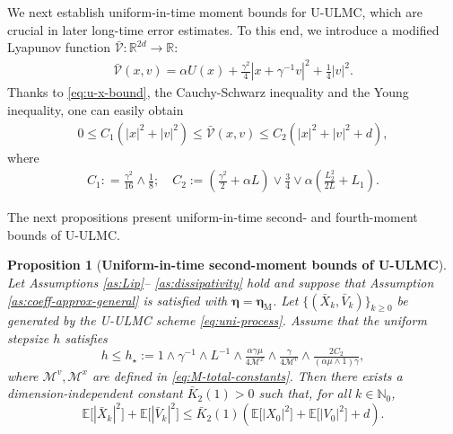 \documentclass[12pt]{article}
\numberwithin{equation}{section}
\newcommand{\M}{\mathcal{M}}
\newtheorem{prop}{Proposition}[section]
\begin{document}
We next establish uniform-in-time moment bounds for U-ULMC, which are crucial in later long-time error estimates.
To this end, we introduce a modified Lyapunov function  $\bar{\mathcal{V}} \colon \mathbb{R}^{2d} \to \mathbb{R}$: 
\begin{align}\label{eq:Lyapunov-modified}
\bar{\mathcal{V}}(x,v)
=
\alpha U (x)
+
\tfrac{\gamma^2}{4}
|x+\gamma^{-1}v|^2
+
\tfrac{1}{4}
|v|^2.
    \end{align}
Thanks to \eqref{eq:u-x-bound}, the Cauchy-Schwarz inequality and the Young inequality, one can easily obtain
\begin{align}\label{eq:ineq_lya_m}
    0\leq C_1(|x|^2+|v|^2)\leq \bar{\mathcal{V}}(x,v)\leq C_2(|x|^2+|v|^2+d),
\end{align}
where
\begin{align}
\label{eq:const-C1-and C2}
C_1:
=
\tfrac{\gamma^2}{16}
\wedge
\tfrac{1}{8}; 
\quad 
C_2
:=
(\tfrac{\gamma^2}{2}+\alpha L)
\vee
\tfrac{3}{4}
\vee
\alpha(\tfrac{L_2^2}{2L}+L_1).
\end{align}

The next propositions present uniform-in-time second- and fourth-moment bounds of U-ULMC.
%
\begin{prop} [\textbf{Uniform-in-time second-moment bounds of U-ULMC}]
\label{prop:numerical-bound}
%
Let Assumptions \ref{as:Lip}--
\ref{as:dissipativity} hold and suppose that
Assumption \ref{as:coeff-approx-general} is satisfied with
$\boldsymbol{\eta}=\boldsymbol{\eta}_{\mathrm M}$.
%
Let $\{(\bar X_k,\bar V_k)\}_{k\geq0}$ be generated by the U-ULMC scheme \eqref{eq:uni-process}. 
%
Assume that the uniform stepsize $h$ satisfies
\begin{equation}
\label{eq:condition-of-stepsize}
h 
\leq
h_\star
:=
1
\wedge \gamma^{-1}
\wedge L^{-1}
\wedge
\tfrac{\alpha \gamma  \mu}{4\M^x}
\wedge
\tfrac{\gamma}{4\M^v}
\wedge
\tfrac{2C_2}{(\alpha\mu \wedge 1) \gamma}
,
\end{equation}
where 
$\M^v,\M^x$ are defined in \eqref{eq:M-total-constants}.
Then there exists a dimension-independent constant $\bar K_2(1)>0$ such that, for all $k\in\mathbb N_0$,
\begin{equation}
\label{prop-eq:uniform-moment-bound-compact}
\mathbb E
\big[
|\bar X_k|^2
\big]
+
\mathbb E
\big[
|\bar V_k|^2
\big]
\leq
\bar{K}_2(1)
\left(
\mathbb E
\big[
| X_0|^2
\big]
+
\mathbb E
\big[
| V_0|^2
\big]
+
d
\right).
\end{equation}
\end{prop}
\end{document}
